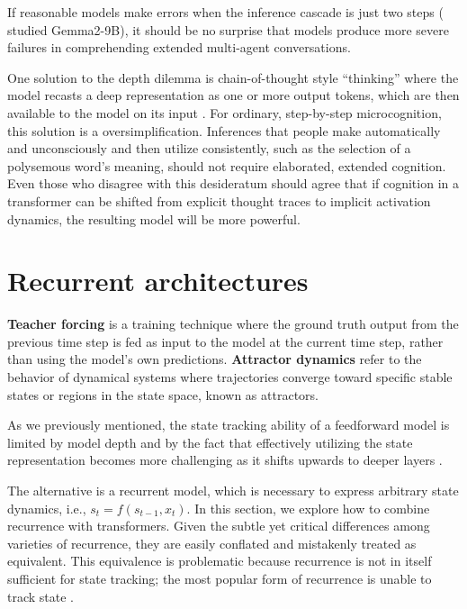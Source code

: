 \documentclass{llmxive}
\begin{document}
If reasonable models make errors when the inference cascade is
just two steps (\citeauthor{lepori2025} studied Gemma2-9B), it should be no surprise that models produce more severe failures
in comprehending extended multi-agent conversations. 

One solution to the depth dilemma is chain-of-thought style ``thinking'' where
the model recasts a deep representation as one or more output tokens, which are
then available to the model on its input \citep{wei2022chain}. For ordinary, step-by-step 
microcognition, this solution is a oversimplification. Inferences that people make 
automatically and unconsciously and then utilize consistently, such as the 
selection of a polysemous word's meaning, should not require elaborated, extended 
cognition. Even those who disagree with this desideratum should agree that if 
cognition in a transformer can be shifted from explicit thought traces to implicit
activation dynamics, the resulting model will be more powerful.

\section{Recurrent architectures}

\textbf{Teacher forcing} is a training technique where the ground truth output from the previous time step is fed as input to the model at the current time step, rather than using the model's own predictions. \textbf{Attractor dynamics} refer to the behavior of dynamical systems where trajectories converge toward specific stable states or regions in the state space, known as attractors.

As we previously mentioned, the state tracking ability of a feedforward model is limited
by model depth  \citep[e.g.,][]{merrill-sabharwal-2023-parallelism,Strobl2024,merrill2025}
and by the fact that effectively utilizing the state
representation becomes more challenging as it shifts upwards to deeper layers
\citep{biran2024,lepori2025,sawyer2025,venhoff2025}.

The alternative is a recurrent model, which is necessary to express arbitrary 
state dynamics, i.e., $s_t = f(s_{t-1},x_t)$. In this section, we explore
how to combine recurrence with transformers.
Given the subtle yet critical differences among varieties of recurrence, they are easily conflated and mistakenly
treated as equivalent.
This equivalence is problematic because recurrence is not
in itself sufficient for state tracking; the most popular
form of recurrence is unable to track state \citep{merrill2025illusion}.
\end{document}
